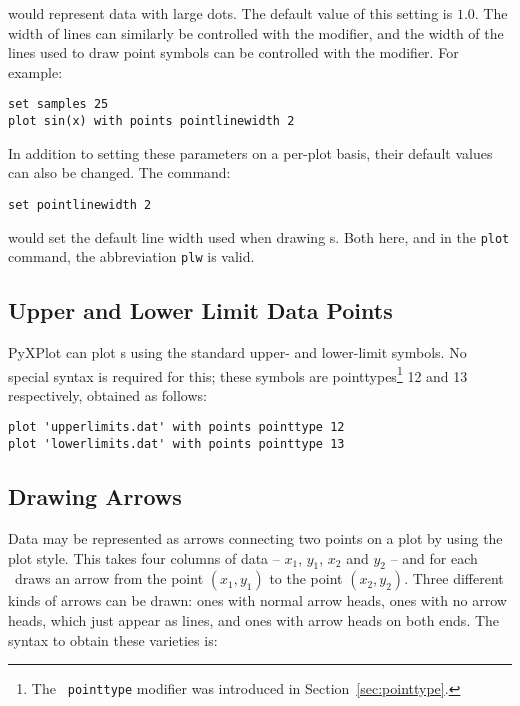 \noindent would represent data with large dots. The default value of this
setting is $1.0$. The width of lines can similarly be controlled with the
 modifier, and the width of the lines used to draw point
symbols can be controlled with the  modifier. For
example:

\begin{verbatim}
set samples 25
plot sin(x) with points pointlinewidth 2
\end{verbatim}

\noindent In addition to setting these parameters on a per-plot basis, their
default values can also be changed. The command:

\begin{verbatim}
set pointlinewidth 2
\end{verbatim}

\noindent would set the default line width used when drawing \datapoint s. Both
here, and in the {\tt plot} command, the abbreviation {\tt plw} is valid. 

\subsection{Upper and Lower Limit Data Points}

PyXPlot can plot \datapoint s using the standard upper- and lower-limit
symbols. No special
syntax is required for this; these symbols are pointtypes\footnote{The {\tt
pointtype} modifier was introduced in Section~\ref{sec:pointtype}.} 12 and 13
respectively, obtained as follows:

\begin{verbatim}
plot 'upperlimits.dat' with points pointtype 12
plot 'lowerlimits.dat' with points pointtype 13
\end{verbatim}

\subsection{Drawing Arrows}

Data may be represented as arrows connecting two points on a plot by using the
 plot style.  This takes four columns of data -- $x_1$, $y_1$,
$x_2$ and $y_2$ -- and for each \datapoint\ draws an arrow from the point
$(x_1,y_1)$ to the point $(x_2,y_2)$.  Three different kinds of arrows can be
drawn: ones with normal arrow heads, ones with no arrow heads, which just
appear as lines, and ones with arrow heads on both ends. The syntax to obtain
these varieties is:

